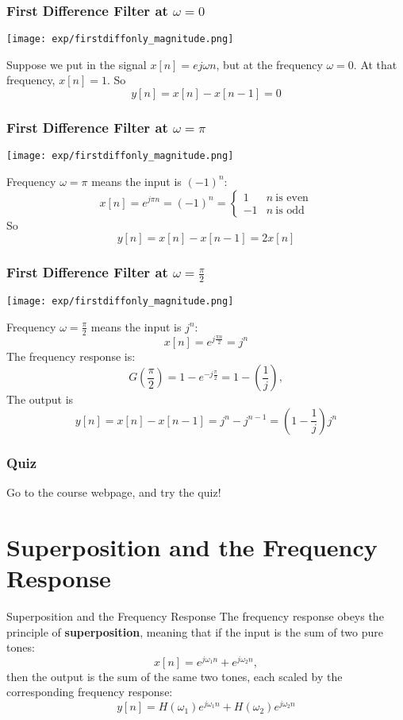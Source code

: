 \documentclass{beamer}
\begin{document}
\begin{frame}
  \frametitle{First Difference Filter at $\omega=0$}

  \centerline{\texttt{[image: exp/firstdiffonly\_magnitude.png]}}

  Suppose we put in the signal $x[n]=e{j\omega n}$, but at the frequency $\omega=0$.
  At that frequency, $x[n]=1$.  So
  \[
  y[n] = x[n]-x[n-1] = 0
  \]
\end{frame}


\begin{frame}
  \frametitle{First Difference Filter at $\omega=\pi$}
  \centerline{\texttt{[image: exp/firstdiffonly\_magnitude.png]}}
  Frequency $\omega=\pi$ means the input is $(-1)^n$:
  \[
  x[n] = e^{j\pi n} = (-1)^n= \begin{cases}
    1 & n~\mbox{is even}\\
    -1 & n~\mbox{is odd}
  \end{cases}
  \]
  So
  \[
  y[n]=x[n]-x[n-1] = 2x[n]
  \]
\end{frame}

\begin{frame}
  \frametitle{First Difference Filter at $\omega=\frac{\pi}{2}$}
  \centerline{\texttt{[image: exp/firstdiffonly\_magnitude.png]}}
  Frequency $\omega=\frac{\pi}{2}$ means the input is $j^n$:
  \[
  x[n] = e^{j\frac{\pi n}{2}} = j^n
  \]
  The frequency response is:
  \[
  G\left(\frac{\pi}{2}\right) = 1-e^{-j\frac{\pi}{2}} = 1 - \left(\frac{1}{j}\right),
  \]
  The output is
  \[
  y[n] = x[n]-x[n-1] = j^n - j^{n-1} = \left(1-\frac{1}{j}\right)j^n
  \]
\end{frame}

\begin{frame}
  \frametitle{Quiz}

  Go to the course webpage, and try the quiz!

\end{frame}

\section[Superposition]{Superposition and the Frequency Response}
\setcounter{subsection}{1}

\begin{frame}
  \begin{block}{Superposition and the Frequency Response}
    The frequency response obeys the principle of {\bf superposition}, meaning that
    if the input is the sum of two pure tones:
    \[
    x[n] = e^{j\omega_1 n} + e^{j\omega_2 n},
    \]
    then the output is the sum of the same two tones, each scaled by
    the corresponding frequency response:
    \[
    y[n] = H(\omega_1)e^{j\omega_1 n}+H(\omega_2)e^{j\omega_2 n}
    \]
  \end{block}
\end{frame}
\end{document}
